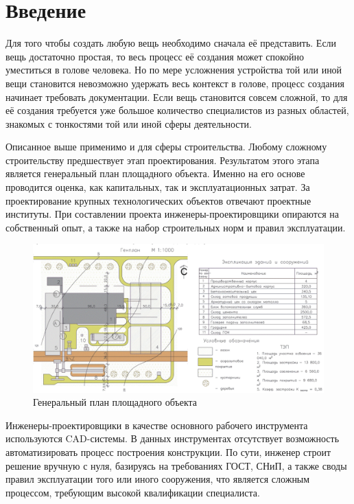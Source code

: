 \section*{\Large{Введение}}


Для того чтобы создать любую вещь необходимо сначала её представить.
Если вещь достаточно простая, то весь процесс её создания может спокойно уместиться в голове человека.
Но по мере усложнения устройства той или иной вещи становится невозможно удержать весь контекст в голове,
процесс создания начинает требовать документации.
Если вещь становится совсем сложной, то для её создания требуется уже большое количество специалистов из разных
областей, знакомых с тонкостями той или иной сферы деятельности.

Описанное выше применимо и для сферы строительства.
Любому сложному строительству предшествует этап проектирования.
Результатом этого этапа является генеральный план площадного объекта.
Именно на его основе проводится оценка, как капитальных, так и эксплуатационных затрат.
За проектирование крупных технологических объектов отвечают проектные институты.
При составлении проекта инженеры-проектировщики опираются на собственный опыт, а также на набор строительных норм
и правил эксплуатации.

\begin{figure}
    \vspace*{-1.2cm}
    \begin{center}
        \includegraphics[width=\textwidth]{introduction/pictures/site_plan}
    \end{center}
    \caption{Генеральный план площадного объекта}
    \label{pic:introduction__site-plan}
\end{figure}
Инженеры-проектировщики в качестве основного рабочего инструмента используются CAD-системы.
В данных инструментах отсутствует возможность автоматизировать процесс построения конструкции.
По сути, инженер строит решение вручную с нуля, базируясь на требованиях ГОСТ, СНиП, а также своды правил
эксплуатации того или иного сооружения, что является сложным процессом, требующим высокой квалификации специалиста.
